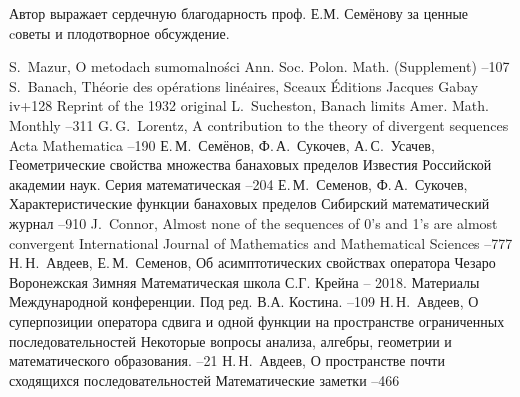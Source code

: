 \documentclass{article}
\theoremstyle{plain}
\theoremstyle{definition}
\begin{document}
\begin{fulltext}
Автор выражает сердечную благодарность проф. Е.М. Семёнову за ценные cоветы и плодотворное обсуждение.
\end{fulltext}



\begin{thebibliography}{99}
	\by S.~Mazur,
	\paper O metodach sumomalności
	\jour Ann. Soc. Polon. Math. (Supplement)
	--107
	\by S.~Banach,
	\book Théorie des opérations linéaires,
	\publaddr Sceaux
	\publ Éditions Jacques Gabay
	\pages iv+128
	\miscnote Reprint of the 1932 original
	\by L.~Sucheston,
	\paper Banach limits
	\jour Amer. Math. Monthly
	--311
	\by G.\,G.~Lorentz,
	\paper A contribution to the theory of divergent sequences
	\jour Acta Mathematica
	--190
	\by Е.\,М.~Семёнов, Ф.\,А.~Сукочев, А.\,С.~Усачев,
	\paper Геометрические свойства множества банаховых пределов
	\jour Известия Российской академии наук. Серия математическая
	--204
	\by Е.\,М.~Семенов, Ф.\,А.~Сукочев,
	\paper Характеристические функции банаховых пределов
	\jour Сибирский математический журнал
	--910
	\by J.~Connor,
	\paper Almost none of the sequences of 0’s and 1’s are almost convergent
	\jour International Journal of Mathematics and Mathematical Sciences
	--777
	\by Н.\,Н.~Авдеев, Е.\,М.~Семенов,
	\paper Об асимптотических свойствах оператора Чезаро
	\jour Воронежская Зимняя Математическая школа С.Г. Крейна -- 2018.
	Материалы Международной конференции. Под ред. В.А. Костина.
	--109
	\by Н.\,Н.~Авдеев,
	\paper О суперпозиции оператора сдвига и одной функции на пространстве
	ограниченных последовательностей
	\jour Некоторые вопросы анализа, алгебры, геометрии и математического
	образования.
	--21
	\by Н.\,Н.~Авдеев,
	\paper О пространстве почти сходящихся последовательностей
	\jour Математические заметки
	--466
\end{thebibliography}
\end{document}
